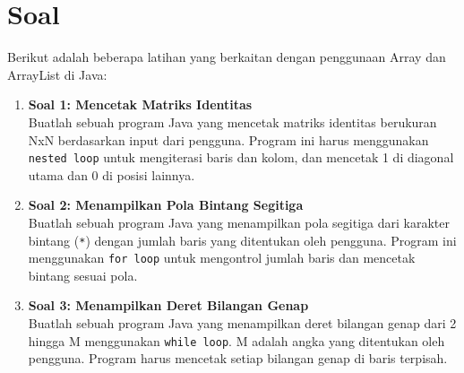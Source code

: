 \section{Soal}

Berikut adalah beberapa latihan yang berkaitan dengan penggunaan Array dan ArrayList di Java:

\begin{enumerate}
	
	\item \textbf{Soal 1: Mencetak Matriks Identitas} \\
	Buatlah sebuah program Java yang mencetak matriks identitas berukuran NxN berdasarkan input dari pengguna. Program ini harus menggunakan \texttt{nested loop} untuk mengiterasi baris dan kolom, dan mencetak 1 di diagonal utama dan 0 di posisi lainnya.
	
	\item \textbf{Soal 2: Menampilkan Pola Bintang Segitiga} \\
	Buatlah sebuah program Java yang menampilkan pola segitiga dari karakter bintang (\texttt{*}) dengan jumlah baris yang ditentukan oleh pengguna. Program ini menggunakan \texttt{for loop} untuk mengontrol jumlah baris dan mencetak bintang sesuai pola.
	
	\item \textbf{Soal 3: Menampilkan Deret Bilangan Genap} \\
	Buatlah sebuah program Java yang menampilkan deret bilangan genap dari 2 hingga M menggunakan \texttt{while loop}. M adalah angka yang ditentukan oleh pengguna. Program harus mencetak setiap bilangan genap di baris terpisah.
	
\end{enumerate}